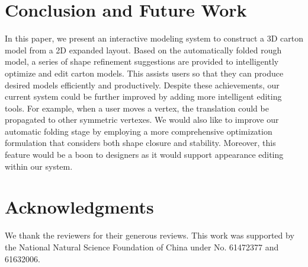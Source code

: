 \documentclass{gmp2018}
\begin{document}









\section{Conclusion and Future Work}\label{sec:conclusion}
In this paper, we present an interactive modeling system to construct a 3D carton model from a 2D expanded layout. 
Based on the automatically folded rough model, a series of shape refinement suggestions are provided to intelligently optimize and edit carton models. This assists users so that they can produce desired models efficiently and productively.  
%
Despite these achievements, our current system could be further improved by adding more intelligent editing tools. For example, when a user moves a vertex, the translation could be propagated to other symmetric vertexes.
We would also like to improve our automatic folding stage by employing a more comprehensive optimization formulation that considers both shape closure and stability. 
%
Moreover, this feature would be a boon to designers as it would support appearance editing within our system. 
%

\section*{Acknowledgments} We thank the reviewers for their generous reviews. This work was supported by the National Natural Science Foundation of China under No. 61472377 and 61632006.



\end{document}
